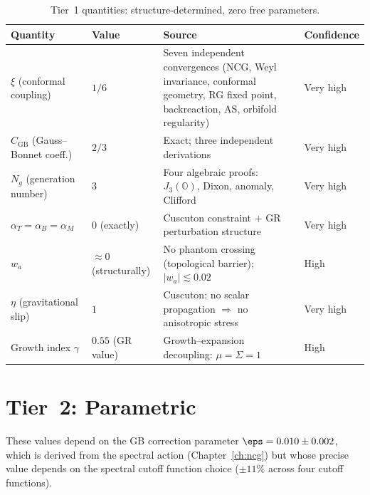 \begin{table}[h!]
\caption{Tier~1 quantities: structure-determined, zero free parameters.}
\label{tab:val-tier1}
\small
\renewcommand{\arraystretch}{1.25}
\begin{tabular}{@{}p{3.5cm}p{3.0cm}p{5.5cm}p{2.5cm}@{}}
\toprule
\textbf{Quantity} & \textbf{Value} & \textbf{Source} & \textbf{Confidence} \\
\midrule

$\xi$ (conformal coupling) &
$1/6$ &
Seven independent convergences (NCG, Weyl invariance, conformal geometry, RG fixed point, backreaction, AS, orbifold regularity) &
Very high \\

$C_\mathrm{GB}$ (Gauss--Bonnet coeff.) &
$2/3$ &
Exact; three independent derivations &
Very high \\

$N_g$ (generation number) &
$3$ &
Four algebraic proofs: $J_3(\mathbb{O})$, Dixon, anomaly, Clifford &
Very high \\

$\alpha_T = \alpha_B = \alpha_M$ &
$0$ (exactly) &
Cuscuton constraint + GR perturbation structure &
Very high \\

$w_a$ &
$\approx 0$ (structurally) &
No phantom crossing (topological barrier); $|w_a| \lesssim 0.02$ &
High \\

$\eta$ (gravitational slip) &
$1$ &
Cuscuton: no scalar propagation $\Rightarrow$ no anisotropic stress &
Very high \\

Growth index $\gamma$ &
$0.55$ (GR value) &
Growth--expansion decoupling: $\mu = \Sigma = 1$ &
High \\

\bottomrule
\end{tabular}
\end{table}

\section{Tier~2: Parametric}
\label{app:val-tier2}

These values depend on the GB correction parameter $\eps = 0.010 \pm 0.002$, which is derived from the spectral action (Chapter~\ref{ch:ncg}) but whose precise value depends on the spectral cutoff function choice ($\pm 11\%$ across four cutoff functions).

